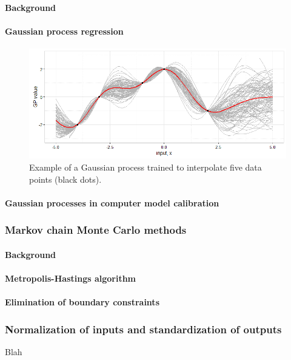 \documentclass{article}
\begin{document}
\paragraph{Background}



\paragraph{Gaussian process regression}

\begin{figure}[h]
\centering
\includegraphics[width=.75\linewidth]{gp_example}
\caption{Example of a Gaussian process trained to interpolate five data points (black dots).}
\label{gp_example}
\end{figure}

\paragraph{Gaussian processes in computer model calibration}

\subsubsection{Markov chain Monte Carlo methods}

\paragraph{Background}

\paragraph{Metropolis-Hastings algorithm}

\paragraph{Elimination of boundary constraints}

\subsubsection{Normalization of inputs and standardization of outputs}
Blah
\end{document}
